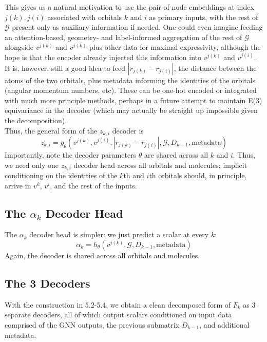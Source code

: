 \documentclass[12pt]{article}
\begin{document}
    This gives us a natural motivation to use the pair of node embeddings at index $j(k), j(i)$ associated with orbitals $k$ and $i$ as primary inputs, with the rest of $\mathcal{G}$ present only as auxiliary information if needed. One could even imagine feeding an attention-based, geometry- and label-informed aggregation of the rest of $\mathcal{G}$ alongside $v^{j(k)}$ and $v^{j(k)}$ plus other data for maximal expressivity, although the hope is that the encoder already injected this information into $v^{j(k)}$ and $v^{j(i)}$. \\[-6pt]
    
    It is, however, still a good idea to feed $|r_{j(k)} - r_{j(i)}|$, the distance between the atoms of the two orbitals, plus metadata informing the identities of the orbitals (angular momentum numbers, etc). These can be one-hot encoded or integrated with much more principle methods, perhaps in a future attempt to maintain E(3) equivariance in the decoder (which may actually be straight up impossible given the decomposition). \\[-6pt]

    Thus, the general form of the $z_{k, i}$ decoder is
    \begin{equation}
        z_{k, i} = g_\theta(v^{j(k)}, v^{j(i)}, |r_{j(k)} - r_{j(i)}|, \mathcal{G}, D_{k-1},\text{metadata})
    \end{equation}
    Importantly, note the decoder parameters $\theta$ are shared across all $k$ and $i$. Thus, we need only one $z_{k, i}$ decoder head across all orbitals and molecules; implicit conditioning on the identities of the $k$th and $i$th orbitals should, in principle, arrive in $v^k$, $v^i$, and the rest of the inputs. 

    \subsection{The $\alpha_k$ Decoder Head}
    The $\alpha_k$ decoder head is simpler: we just predict a scalar at every $k$:
    \begin{equation}
        \alpha_k = h_\theta(v^{j(k)}, \mathcal{G}, D_{k-1}, \text{metadata})
    \end{equation}
    Again, the decoder is shared across all orbitals and molecules. 

    \subsection{The 3 Decoders}
    With the construction in 5.2-5.4, we obtain a clean decomposed form of $F_k$ as 3 separate decoders, all of which output scalars conditioned on input data comprised of the GNN outputs, the previous submatrix $D_{k-1}$, and additional metadata. \\[-6pt]
\end{document}
